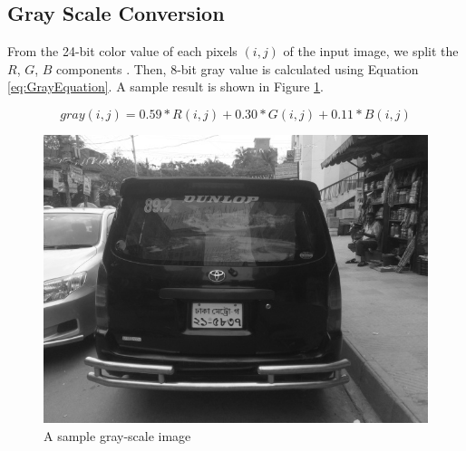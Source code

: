 \documentclass{standalone}
\begin{document}
\subsection{Gray Scale Conversion}
From the 24-bit color value of each pixels $(i, j)$ of the input image, we split the $R$, $G$, $B$ components . Then, 8-bit gray value is calculated using Equation \ref{eq:GrayEquation}. A sample result is shown in Figure \ref{fig:GraySample}.

\begin{equation}\label{eq:GrayEquation}
gray(i,j) = 0.59 * R(i,j) + 0.30 * G(i,j) + 0.11 * B(i, j)
\end{equation}

\begin{figure}
	\centering
	\includegraphics[width=.8\linewidth]{./img/sample/stage1.jpg}
	\caption{A sample gray-scale image} 
	 \label{fig:GraySample}
\end{figure}
\end{document}
